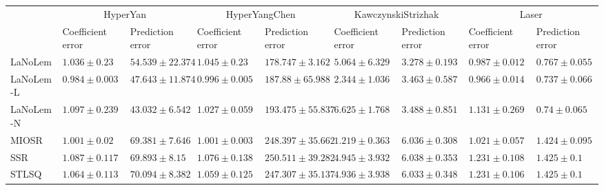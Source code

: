 \begin{table*}
{\begin{tabular}{lllllllll}
 & \multicolumn{2}{c}{HyperYan} & \multicolumn{2}{c}{HyperYangChen} & \multicolumn{2}{c}{KawczynskiStrizhak} & \multicolumn{2}{c}{Laser} \\
 & Coefficient error & Prediction error & Coefficient error & Prediction error & Coefficient error & Prediction error & Coefficient error & Prediction error \\
\midrule
LaNoLem & $1.036\pm 0.23$ & $54.539\pm 22.374$ & $1.045\pm 0.23$ & $\mathbf{178.747}\pm 3.162$ & $5.064\pm 6.329$ & $\mathbf{3.278}\pm 0.193$ & $0.987\pm 0.012$ & $0.767\pm 0.055$ \\
LaNoLem-L & $\mathbf{0.984}\pm 0.003$ & $47.643\pm 11.874$ & $\mathbf{0.996}\pm 0.005$ & $187.88\pm 65.988$ & $2.344\pm 1.036$ & $3.463\pm 0.587$ & $\mathbf{0.966}\pm 0.014$ & $\mathbf{0.737}\pm 0.066$ \\
LaNoLem-N & $1.097\pm 0.239$ & $\mathbf{43.032}\pm 6.542$ & $1.027\pm 0.059$ & $193.475\pm 55.837$ & $6.625\pm 1.768$ & $3.488\pm 0.851$ & $1.131\pm 0.269$ & $0.74\pm 0.065$ \\
MIOSR & $1.001\pm 0.02$ & $69.381\pm 7.646$ & $1.001\pm 0.003$ & $248.397\pm 35.662$ & $\mathbf{1.219}\pm 0.363$ & $6.036\pm 0.308$ & $1.021\pm 0.057$ & $1.424\pm 0.095$ \\
SSR & $1.087\pm 0.117$ & $69.893\pm 8.15$ & $1.076\pm 0.138$ & $250.511\pm 39.282$ & $4.945\pm 3.932$ & $6.038\pm 0.353$ & $1.231\pm 0.108$ & $1.425\pm 0.1$ \\
STLSQ & $1.064\pm 0.113$ & $70.094\pm 8.382$ & $1.059\pm 0.125$ & $247.307\pm 35.137$ & $4.936\pm 3.938$ & $6.033\pm 0.348$ & $1.231\pm 0.106$ & $1.425\pm 0.1$ \\

\midrule


\end{tabular}}
\end{table*}
